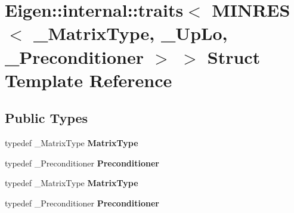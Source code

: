 \hypertarget{struct_eigen_1_1internal_1_1traits_3_01_m_i_n_r_e_s_3_01___matrix_type_00_01___up_lo_00_01___preconditioner_01_4_01_4}{}\section{Eigen\+:\+:internal\+:\+:traits$<$ M\+I\+N\+R\+ES$<$ \+\_\+\+Matrix\+Type, \+\_\+\+Up\+Lo, \+\_\+\+Preconditioner $>$ $>$ Struct Template Reference}
\label{struct_eigen_1_1internal_1_1traits_3_01_m_i_n_r_e_s_3_01___matrix_type_00_01___up_lo_00_01___preconditioner_01_4_01_4}
\subsection*{Public Types}
\begin{DoxyCompactItemize}
\item 
\mbox{\label{struct_eigen_1_1internal_1_1traits_3_01_m_i_n_r_e_s_3_01___matrix_type_00_01___up_lo_00_01___preconditioner_01_4_01_4_a3691fee920b886dd88c999822c6e9e5c}} 
typedef \+\_\+\+Matrix\+Type {\bfseries Matrix\+Type}
\item 
\mbox{\label{struct_eigen_1_1internal_1_1traits_3_01_m_i_n_r_e_s_3_01___matrix_type_00_01___up_lo_00_01___preconditioner_01_4_01_4_a3f3f17b775bea08e709a72ed320f9e91}} 
typedef \+\_\+\+Preconditioner {\bfseries Preconditioner}
\item 
\mbox{\label{struct_eigen_1_1internal_1_1traits_3_01_m_i_n_r_e_s_3_01___matrix_type_00_01___up_lo_00_01___preconditioner_01_4_01_4_a3691fee920b886dd88c999822c6e9e5c}} 
typedef \+\_\+\+Matrix\+Type {\bfseries Matrix\+Type}
\item 
\mbox{\label{struct_eigen_1_1internal_1_1traits_3_01_m_i_n_r_e_s_3_01___matrix_type_00_01___up_lo_00_01___preconditioner_01_4_01_4_a3f3f17b775bea08e709a72ed320f9e91}} 
typedef \+\_\+\+Preconditioner {\bfseries Preconditioner}
\end{DoxyCompactItemize}


